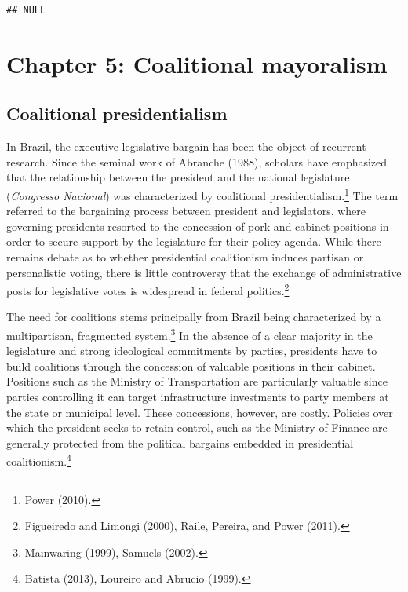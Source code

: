 \documentclass[12pt,]{article}
\let\rmarkdownfootnote\footnote%
\def\footnote{\protect\rmarkdownfootnote}
\begin{document}
\begin{verbatim}
## NULL
\end{verbatim}

\pagebreak

\hypertarget{chapter-5-coalitional-mayoralism}{%
\section{Chapter 5: Coalitional
mayoralism}\label{chapter-5-coalitional-mayoralism}}

\hypertarget{coalitional-presidentialism}{%
\subsection{Coalitional
presidentialism}\label{coalitional-presidentialism}}

In Brazil, the executive-legislative bargain has been the object of
recurrent research. Since the seminal work of Abranche (1988), scholars
have emphasized that the relationship between the president and the
national legislature (\emph{Congresso Nacional}) was characterized by
coalitional presidentialism.\footnote{Power (2010).} The term referred
to the bargaining process between president and legislators, where
governing presidents resorted to the concession of pork and cabinet
positions in order to secure support by the legislature for their policy
agenda. While there remains debate as to whether presidential
coalitionism induces partisan or personalistic voting, there is little
controversy that the exchange of administrative posts for legislative
votes is widespread in federal politics.\footnote{Figueiredo and Limongi
  (2000), Raile, Pereira, and Power (2011).}

The need for coalitions stems principally from Brazil being
characterized by a multipartisan, fragmented system.\footnote{Mainwaring
  (1999), Samuels (2002).} In the absence of a clear majority in the
legislature and strong ideological commitments by parties, presidents
have to build coalitions through the concession of valuable positions in
their cabinet. Positions such as the Ministry of Transportation are
particularly valuable since parties controlling it can target
infrastructure investments to party members at the state or municipal
level. These concessions, however, are costly. Policies over which the
president seeks to retain control, such as the Ministry of Finance are
generally protected from the political bargains embedded in presidential
coalitionism.\footnote{Batista (2013), Loureiro and Abrucio (1999).}
\end{document}
